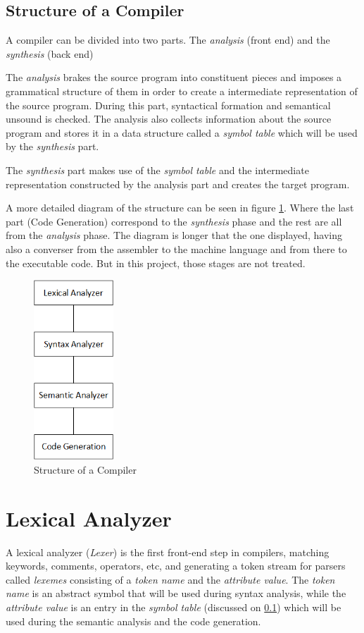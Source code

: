 \documentclass[conference]{IEEEtran}
\begin{document}
\subsection{Structure of a Compiler}\label{sub_structure_of_a_compiler}

A compiler can be divided into two parts. The \textit{analysis} (front end) and the \textit{synthesis} (back end)

The \textit{analysis} brakes the source program into constituent pieces and imposes a grammatical structure of them in order to create a intermediate representation of the source program. During this part, syntactical formation and semantical unsound is checked. The analysis also collects information about the source program and stores it in a data structure called a \textit{symbol table} which will be used by the \textit{synthesis} part.

The \textit{synthesis} part makes use of the \textit{symbol table} and the intermediate representation constructed by the analysis part and creates the target program.

A more detailed diagram of the structure can be seen in figure \ref{fig_struct_of_compilator}. Where the last part (Code Generation) correspond to the \textit{synthesis} phase and the rest are all from the \textit{analysis} phase. The diagram is longer that the one displayed, having also a converser from the assembler to the machine language and from there to the executable code. But in this project, those stages are not treated.

\begin{figure}[H]
\centering
\includegraphics[width=3cm]{images/Diagram.png}
\caption{Structure of a Compiler}
\label{fig_struct_of_compilator}
\end{figure}

\section{Lexical Analyzer}
A lexical analyzer (\textit{Lexer}) is the first front-end step in compilers, matching keywords, comments, operators, etc, and generating a token stream for parsers called \textit{lexemes} consisting of a \textit{token name} and the \textit{attribute value}. 
The \textit{token name} is an abstract symbol that will be used during syntax analysis, while the \textit{attribute value} is an entry in the \textit{symbol table} (discussed on \ref{sub_structure_of_a_compiler}) which will be used during the semantic analysis and the code generation.
\end{document}
